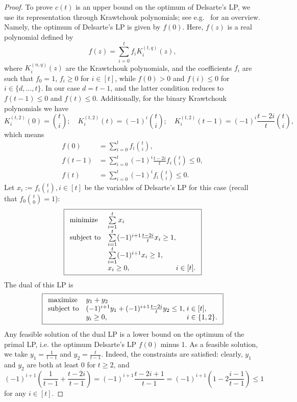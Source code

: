 \documentclass[a4paper]{article}
\begin{document}
\begin{proof}
To prove $c(t)$ is an upper bound on the optimum of Delsarte's LP, we use its representation through Krawtchouk polynomials; see e.g.~\cite{BD2021} for an overview. Namely, the optimum of Delsarte's LP is given by $f(0)$. Here, $f(z)$ is a real polynomial defined by $$f(z) = \sum_{i=0}^t f_i K_i^{(t,q)}(z),$$ where $K_i^{(n,q)}(z)$ are the Krawtchouk polynomials, and the coefficients $f_i$ are such that $f_0=1$, $f_i\geq 0$ for $i\in[t]$, while $f(0)>0$ and $f(i)\leq 0$ for $i\in\{d,\dots,t\}$. In our case $d=t-1$, and the latter condition reduces to $f(t-1)\leq0$ and $f(t)\leq0$. Additionally, for the binary Krawtchouk polynomials we have
$$K_i^{(t,2)}(0)={t \choose i}; \quad K_i^{(t,2)}(t)=(-1)^i{t \choose i}; \quad K_i^{(t,2)}(t-1)=(-1)^i\frac{t-2i}t{t \choose i},$$
which means
\begin{align*}
    f(0) &= \sum\limits_{i=0}^t f_i {t\choose i}, \\
    f(t-1) &= \sum\limits_{i=0}^t (-1)^i\frac{t-2i}t f_i {t\choose i}\leq 0, \\
    f(t) &= \sum\limits_{i=0}^t (-1)^i f_i {t\choose i} \leq 0.
\end{align*}
Let $x_i:= f_i {t\choose i}, i\in[t]$ be the variables of Delsarte's LP for this case (recall that $f_0{t\choose 0}=1$):
\begin{equation*}
    \boxed{
\begin{array}{ll@{}l}
\text{minimize}  &\sum\limits_{i=1}^t x_i\\
\text{subject to} &\sum\limits_{i=1}^t (-1)^{i+1}\frac{t-2i}t x_i\geq 1,&\\
&\sum\limits_{i=1}^t (-1)^{i+1} x_i\geq 1,&\\
&x_i\geq 0,&i\in[t].\\
\end{array}
}
\end{equation*}
The dual of this LP is
\begin{equation*}
    \boxed{
\begin{array}{ll@{}l}
\text{maximize}  &y_1+y_2\\
\text{subject to} &(-1)^{i+1}y_1+(-1)^{i+1}\frac{t-2i}t y_2\leq 1,&\;i\in[t],\\
&y_i\geq 0,&\;i\in\{1,2\}.\\
\end{array}
}
\end{equation*}
Any feasible solution of the dual LP is a lower bound on the optimum of the primal LP, i.e. the optimum Delsarte's LP $f(0)$ minus 1. As a feasible solution, we take $y_1 = \frac1{t-1}$ and $y_2=\frac{t}{t-1}$. Indeed, the constraints are satisfied: clearly, $y_1$ and $y_2$ are both at least $0$ for $t\geq2$, and
$$
    (-1)^{i+1}\left(\frac1{t-1}+\frac{t-2i}{t-1}\right) = (-1)^{i+1}\frac{t-2i+1}{t-1} = (-1)^{i+1} \left(1-2\frac{i-1}{t-1}\right)\leq 1
$$
for any $i\in[t]$.


\end{proof}
\end{document}
